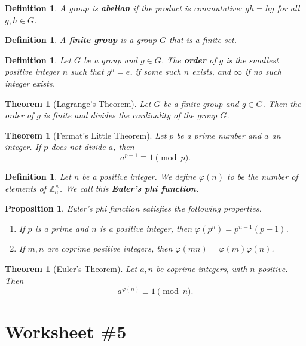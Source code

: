 \documentclass[12pt]{amsart}
\newcommand{\Z}{\mathbb{Z}}
\numberwithin{equation}{section}
\theoremstyle{plain} %
\newtheorem{thm}	[section]	{Theorem}
\newtheorem{prop}	[section]	{Proposition}
\newtheorem{defn}	[section]	{Definition}
\begin{document}
\begin{defn} A group is \textbf{abelian} if the product is commutative: $gh=hg$ for all $g,h\in G$.
\end{defn}

\begin{defn} A \textbf{finite group} is a group $G$ that is a finite set.
\end{defn}


\begin{defn}  Let $G$ be a group and $g\in G$. The \textbf{order} of $g$ is the smallest positive integer $n$ such that $g^n =e$, if some such $n$ exists, and $\infty$ if no such integer exists.
\end{defn}

\begin{thm}[Lagrange's Theorem]  Let $G$ be a finite group and $g\in G$. Then the order of $g$ is finite and divides the cardinality of the group $G$.
\end{thm}


\begin{thm}[Fermat's Little Theorem] Let $p$ be a prime number and $a$ an integer. If $p$ does not divide $a$, then \[ a^{p-1} \equiv 1 \pmod p.\] 
\end{thm}

\begin{defn} Let $n$ be a positive integer. We define $\varphi(n)$ to be the number of elements of $\Z_n^\times$. We call this \textbf{Euler's phi function}.
\end{defn}

\begin{prop} Euler's phi function satisfies the following properties.
\begin{enumerate}
\item If $p$ is a prime and $n$ is a positive integer, then $\varphi(p^n) = p^{n-1}(p-1)$.
\item If $m,n$ are coprime positive integers, then $\varphi(mn)=\varphi(m)\varphi(n)$.
\end{enumerate}
\end{prop}

\begin{thm}[Euler's Theorem] Let $a,n$ be coprime integers, with $n$ positive. Then
\[ a^{\varphi(n)} \equiv 1 \pmod n.\]
\end{thm}


\section*{Worksheet \#5}
\end{document}
